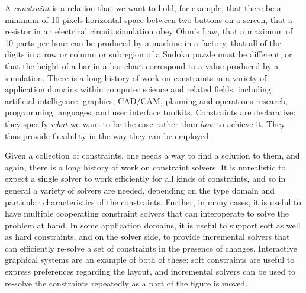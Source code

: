 

A \emph{constraint} is a relation that we want to hold, for example,
that there be a minimum of 10 pixels horizontal space between two
buttons on a screen, that a resistor in an electrical circuit
simulation obey Ohm's Law, that a maximum of 10 parts per hour can be
produced by a machine in a factory, that all of the digits in a row or
column or subregion of a Sudoku puzzle must be different, or that the
height of a bar in a bar chart correspond to a value produced by a
simulation.  There is a long history of work on constraints in a
variety of application domains within computer science and related
fields, including artificial intelligence, graphics, CAD/CAM, planning
and operations research, programming languages, and user interface
toolkits.  Constraints are declarative: they specify \emph{what} we
want to be the case rather than \emph{how} to achieve it.  They thus
provide flexibility in the way they can be employed.

Given a collection of constraints, one needs a way to find a solution
to them, and again, there is a long history of work on constraint
solvers.  It is unrealistic to expect a single solver to work
efficiently for all kinds of constraints, and so in general a variety
of solvers are needed, depending on the type domain and particular
characteristics of the constraints.  Further, in many cases, it is
useful to have multiple cooperating constraint solvers that can
interoperate to solve the problem at hand.  In some application
domains, it is useful to support soft as well as hard constraints, and
on the solver side, to provide incremental solvers that can
efficiently re-solve a set of constraints in the presence of changes.
Interactive graphical systems are an example of both of these: soft
constraints are useful to express preferences regarding the layout,
and incremental solvers can be used to re-solve the constraints
repeatedly as a part of the figure is moved.

